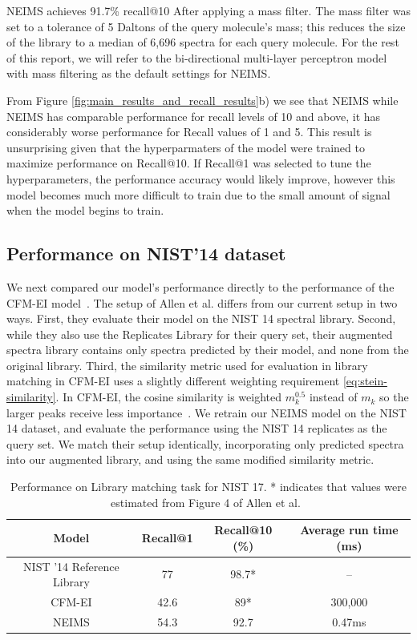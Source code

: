 \documentclass{article}
\begin{document}

NEIMS achieves 91.7\% recall@10 After applying a mass filter. The mass filter was set to a tolerance of 5 Daltons of the query molecule's mass; this reduces the size of the library to a median of 6,696 spectra for each query molecule. 
For the rest of this report, we will refer to the bi-directional multi-layer perceptron model with mass filtering as the default settings for NEIMS.

From Figure \ref{fig:main_results_and_recall_results}b) we see that NEIMS while NEIMS has comparable performance for recall levels of 10 and above, it has considerably worse performance for Recall values of 1 and 5. This result is unsurprising given that the hyperparmaters of the model were trained to maximize performance on Recall@10. If Recall@1 was selected to tune the hyperparameters, the performance accuracy would likely improve, however this model becomes much more difficult to train due to the small amount of signal when the model begins to train.

\subsection{Performance on NIST'14 dataset}
\label{sec:NIST14-results}

We next compared our model's performance directly to the performance of the CFM-EI model~\cite{allen2016computational}. The setup of Allen et al. differs from our current setup in two ways. First, they evaluate their model on the NIST 14 spectral library. Second, while they also use the Replicates Library for their query set, their augmented spectra library contains only spectra predicted by their model, and none from the original library. Third, the similarity metric used for evaluation in library matching in CFM-EI uses a slightly different weighting requirement \eqref{eq:stein-similarity}. In CFM-EI, the cosine similarity is weighted $m_k^{0.5}$ instead of $m_k$ so the larger peaks receive less importance~\cite{allen2016computational}.
We retrain our NEIMS model on the NIST 14 dataset, and evaluate the performance using the NIST 14 replicates as the query set. We match their setup identically, incorporating only predicted spectra into our augmented library, and using the same modified similarity metric.

\begin{table}[h]
    \centering
    \begin{tabular}{c|c|c|c}
        Model & Recall@1 & Recall@10 (\%) &  Average run time (ms) \\
        \hline
        NIST '14 Reference Library & 77 & 98.7* & -- \\
        CFM-EI & 42.6 & 89* &  300,000 \\
        NEIMS & 54.3 & 92.7 &  0.47ms
    \end{tabular}
    \caption{Performance on Library matching task for NIST 17. * indicates that values were estimated from  Figure 4 of Allen et al.~\cite{allen2016computational}}
    \label{tab:NIST14_results}
\end{table}
\end{document}
